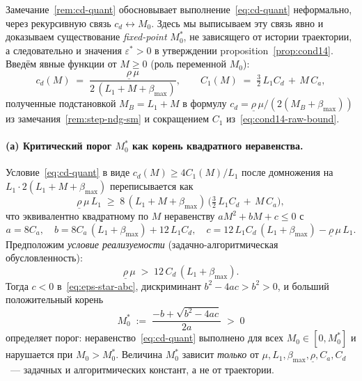 \begin{proposition}
\label{prop:eps-star-finite}
Замечание~\ref{rem:cd-quant} обосновывает выполнение~\eqref{eq:cd-quant}
неформально, через рекурсивную связь $c_d \leftrightarrow M_0$. Здесь
мы выписываем эту связь явно и доказываем существование
\emph{fixed-point} $M_0^{*}$, не зависящего от истории траектории, а
следовательно и значения $\varepsilon^{*} > 0$ в утверждении
proposition~\ref{prop:cond14}. Введём явные функции от $M \ge 0$ (роль
переменной $M_0$):
\begin{equation}
c_d(M) \;=\; \frac{\underline\rho\,\mu}{2\,(L_1 + M + \beta_{\max})},
\qquad
C_1(M) \;=\; \tfrac{3}{2}\, L_1 C_d \,+\, M\, C_a,
\label{eq:cd-C1-explicit}
\end{equation}
полученные подстановкой $M_B = L_1 + M$ в формулу
$c_d = \underline\rho\,\mu/(2(M_B+\beta_{\max}))$ из
замечания~\ref{rem:step-ndg-sm} и сокращением $C_1$ из~\eqref{eq:cond14-raw-bound}.

\paragraph{(а) Критический порог $M_0^{*}$ как корень квадратного неравенства.}
Условие~\eqref{eq:cd-quant} в виде $c_d(M) \ge 4 C_1(M)/L_1$ после
домножения на $L_1\cdot 2(L_1+M+\beta_{\max})$ переписывается как
\[
\underline\rho\,\mu\, L_1
\;\ge\;
8\,(L_1 + M + \beta_{\max})\,\bigl(\tfrac{3}{2}\, L_1 C_d \,+\, M\, C_a\bigr),
\]
что эквивалентно квадратному по $M$ неравенству
$a M^2 + b M + c \le 0$ с
\begin{equation}
a = 8 C_a,
\quad
b = 8 C_a\,(L_1 + \beta_{\max}) + 12\, L_1 C_d,
\quad
c = 12\, L_1 C_d\,(L_1 + \beta_{\max}) - \underline\rho\,\mu\, L_1.
\label{eq:eps-star-abc}
\end{equation}
Предположим
\emph{условие реализуемости} (задачно-алгоритмическая
обусловленность):
\begin{equation}
\underline\rho\,\mu \;>\; 12\, C_d\,(L_1 + \beta_{\max}).
\label{eq:wp-feasibility}
\end{equation}
Тогда $c < 0$ в~\eqref{eq:eps-star-abc}, дискриминант $b^2 - 4 a c > b^2 > 0$, и
больший положительный корень
\begin{equation}
M_0^{*} \;:=\; \frac{-b + \sqrt{b^2 - 4 a c}}{2 a}
\;>\; 0
\label{eq:M0-star}
\end{equation}
определяет порог: неравенство~\eqref{eq:cd-quant} выполнено для всех
$M_0 \in [0, M_0^{*}]$ и нарушается при $M_0 > M_0^{*}$. Величина
$M_0^{*}$ зависит \emph{только} от $\mu, L_1, \beta_{\max},
\underline\rho, C_a, C_d$~--- задачных и алгоритмических констант, а не
от траектории.


\end{proposition}
